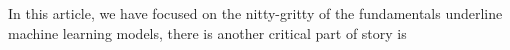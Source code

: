 In this article, we have focused on the nitty-gritty of the fundamentals underline machine learning models, there is another critical part of story is  
